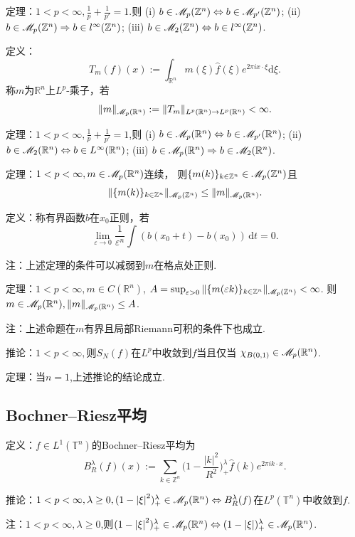 定理：$1<p<\infty,\frac{1}{p}+\frac{1}{p'}=1.$则
(i) $b\in \mathscr{M}_p(\mathbb{Z}^n)\Leftrightarrow b\in \mathscr{M}_{p'}(\mathbb{Z}^n)$;
(ii) $b\in \mathscr{M}_p(\mathbb{Z}^n)\Rightarrow b\in l^\infty(\mathbb{Z}^n)$;
(iii) $b\in \mathscr{M}_2(\mathbb{Z}^n)\Leftrightarrow b\in l^\infty(\mathbb{Z}^n)$.

定义：$$T_m(f)(x):=\int_{\mathbb{R}^n}m(\xi)\hat{f}(\xi)e^{2\pi i x\cdot\xi}\mathrm{d}\xi.$$
称$m$为$\mathbb{R}^n$上$L^p$-乘子，若
$$\|m\|_{\mathscr{M}_p(\mathbb{R}^n)}:=\|T_m\|_{L^p(\mathbb{R}^n)\to L^p(\mathbb{R}^n)}<\infty.$$

定理：$1<p<\infty,\frac{1}{p}+\frac{1}{p'}=1$,则
(i) $b\in \mathscr{M}_p(\mathbb{R}^n)\Leftrightarrow b\in \mathscr{M}_{p'}(\mathbb{R}^n)$;
(ii) $b\in \mathscr{M}_2(\mathbb{R}^n)\Leftrightarrow b\in L^\infty(\mathbb{R}^n)$;
(iii) $b\in \mathscr{M}_p(\mathbb{R}^n)\Rightarrow b\in \mathscr{M}_2(\mathbb{R}^n)$.

定理：$1<p<\infty,m\in \mathscr{M}_p(\mathbb{R}^n)$连续，
则$\{ m(k) \}_{k\in \mathbb{Z}^n}\in \mathscr{M}_p(\mathbb{Z}^n)$且
$$\Vert \{ m(k) \}_{k\in \mathbb{Z}^n}\Vert _{\mathscr{M}_p(\mathbb{Z}^n)}
\leq \Vert m\Vert _{\mathscr{M}_p(\mathbb{R}^n)}.$$

定义：称有界函数$b$在$x_0$正则，若
$$\lim_{\varepsilon \to 0}\frac{1}{\varepsilon^n}\int (b(x_0+t)-b(x_0))\,\mathrm{d}t=0.$$

注：上述定理的条件可以减弱到$m$在格点处正则.

定理：$1<p<\infty,m\in C(\mathbb{R}^n)$,
$A=\sup_{\varepsilon>0}\|\{ m(\varepsilon k) \}_{k\in \mathbb{Z}^n}\|_{\mathscr{M}_p(\mathbb{Z}^n)} <\infty$.
则$m\in \mathscr{M}_p(\mathbb{R}^n),\|m\|_{\mathscr{M}_p(\mathbb{R}^n)}\leq A$.

注：上述命题在$m$有界且局部Riemann可积的条件下也成立.

推论：$1<p<\infty,$则$S_N(f)$在$L^p$中收敛到$f$当且仅当
$\chi_{B(0,1)}\in \mathscr{M}_p(\mathbb{R}^n)$.

定理：当$n=1$,上述推论的结论成立.

\subsection{Bochner--Riesz平均}

定义：$f\in L^1(\mathbb{T}^n)$的Bochner--Riesz平均为
$$B^\lambda_R(f)(x):=\sum_{k\in \mathbb{Z}^n}
\bigg(1-\frac{|k|^2}{R^2}\bigg)_+^\lambda \hat{f}(k)e^{2\pi ik\cdot x}.$$

推论：$1<p<\infty, \lambda\geq 0,(1-\left\vert \xi \right\vert ^2)_+^\lambda\in \mathscr{M}_p(\mathbb{R}^n)
\Leftrightarrow B^\lambda_R(f)$在$L^p(\mathbb{T}^n)$中收敛到$f$.

注：$1<p<\infty,\lambda \geq 0$,则$(1-\left\vert \xi  \right\vert ^2)^\lambda_+\in \mathscr{M}_p(\mathbb{R}^n) 
\Leftrightarrow (1-\left\vert \xi  \right\vert )^\lambda_+\in \mathscr{M}_p(\mathbb{R}^n)$.

